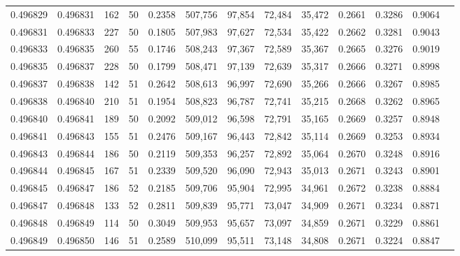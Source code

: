 \begin{tabular}{rrrrrrrrrrrrr}
0.496829 & 0.496831 &   162 &  50 &                                     0.2358 & 507,756 &  97,854 &  72,484 &  35,472 & 0.2661 & 0.3286 & 0.9064 \\
0.496831 & 0.496833 &   227 &  50 &                                     0.1805 & 507,983 &  97,627 &  72,534 &  35,422 & 0.2662 & 0.3281 & 0.9043 \\
0.496833 & 0.496835 &   260 &  55 &                                     0.1746 & 508,243 &  97,367 &  72,589 &  35,367 & 0.2665 & 0.3276 & 0.9019 \\
0.496835 & 0.496837 &   228 &  50 &                                     0.1799 & 508,471 &  97,139 &  72,639 &  35,317 & 0.2666 & 0.3271 & 0.8998 \\
0.496837 & 0.496838 &   142 &  51 &                                     0.2642 & 508,613 &  96,997 &  72,690 &  35,266 & 0.2666 & 0.3267 & 0.8985 \\
0.496838 & 0.496840 &   210 &  51 &                                     0.1954 & 508,823 &  96,787 &  72,741 &  35,215 & 0.2668 & 0.3262 & 0.8965 \\
0.496840 & 0.496841 &   189 &  50 &                                     0.2092 & 509,012 &  96,598 &  72,791 &  35,165 & 0.2669 & 0.3257 & 0.8948 \\
0.496841 & 0.496843 &   155 &  51 &                                     0.2476 & 509,167 &  96,443 &  72,842 &  35,114 & 0.2669 & 0.3253 & 0.8934 \\
0.496843 & 0.496844 &   186 &  50 &                                     0.2119 & 509,353 &  96,257 &  72,892 &  35,064 & 0.2670 & 0.3248 & 0.8916 \\
0.496844 & 0.496845 &   167 &  51 &                                     0.2339 & 509,520 &  96,090 &  72,943 &  35,013 & 0.2671 & 0.3243 & 0.8901 \\
0.496845 & 0.496847 &   186 &  52 &                                     0.2185 & 509,706 &  95,904 &  72,995 &  34,961 & 0.2672 & 0.3238 & 0.8884 \\
0.496847 & 0.496848 &   133 &  52 &                                     0.2811 & 509,839 &  95,771 &  73,047 &  34,909 & 0.2671 & 0.3234 & 0.8871 \\
0.496848 & 0.496849 &   114 &  50 &                                     0.3049 & 509,953 &  95,657 &  73,097 &  34,859 & 0.2671 & 0.3229 & 0.8861 \\
0.496849 & 0.496850 &   146 &  51 &                                     0.2589 & 510,099 &  95,511 &  73,148 &  34,808 & 0.2671 & 0.3224 & 0.8847 \\

\end{tabular}

